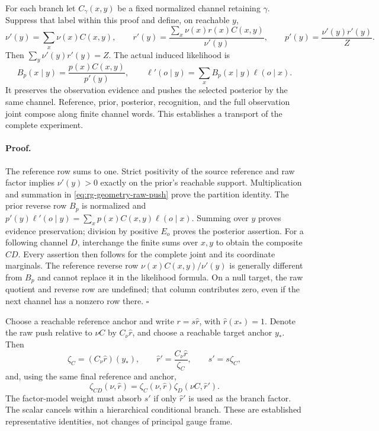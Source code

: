 For each branch let $C_\gamma(x,y)$ be a fixed normalized channel retaining
$\gamma$. Suppress that label within this proof and define, on reachable
$y$,
\begin{equation}
 \nu'(y)=\sum_x\nu(x)C(x,y),\qquad
 r'(y)=\frac{\sum_x\nu(x)r(x)C(x,y)}{\nu'(y)},\qquad
 p'(y)=\frac{\nu'(y)r'(y)}{Z}.
 \label{eq:rg-geometry-raw-push}
\end{equation}
Then $\sum_y\nu'(y)r'(y)=Z$. The actual induced likelihood is
\begin{equation}
 B_p(x\mid y)=\frac{p(x)C(x,y)}{p'(y)},\qquad
 \ell'(o\mid y)=\sum_xB_p(x\mid y)\ell(o\mid x).
 \label{eq:rg-geometry-likelihood}
\end{equation}
It preserves the observation evidence and pushes the selected posterior by
the same channel. Reference, prior, posterior, recognition, and the full
observation joint compose along finite channel words. This establishes a
transport of the complete experiment. 

\paragraph{Proof.}
The reference row sums to one. Strict positivity of the source reference
and raw factor implies $\nu'(y)>0$ exactly on the prior's reachable support.
Multiplication and summation in \cref{eq:rg-geometry-raw-push} prove the
partition identity. The prior reverse row $B_p$ is normalized and
$p'(y)\ell'(o\mid y)=\sum_xp(x)C(x,y)\ell(o\mid x)$.
Summing over $y$ proves evidence preservation; division by positive $E_o$
proves the posterior assertion. For a following channel $D$, interchange
the finite sums over $x,y$ to obtain the composite $CD$. Every assertion
then follows for the complete joint and its coordinate marginals. The
reference reverse row $\nu(x)C(x,y)/\nu'(y)$ is generally different from
$B_p$ and cannot replace it in the likelihood formula. On a null target,
the raw quotient and reverse row are undefined; that column contributes
zero, even if the next channel has a nonzero row there.
$\square$

Choose a reachable reference anchor and write $r=s\widehat r$, with
$\widehat r(x_*)=1$. Denote the raw push relative to $\nu C$ by
$C_\nu\widehat r$, and choose a reachable target anchor $y_*$.
Then
\begin{equation}
 \zeta_C=(C_\nu\widehat r)(y_*),\qquad
 \widehat r'=\frac{C_\nu\widehat r}{\zeta_C},\qquad
 s'=s\zeta_C,
 \label{eq:rg-geometry-anchor}
\end{equation}
and, using the same final reference and anchor,
\begin{equation}
 \zeta_{CD}(\nu,\widehat r)
 =\zeta_C(\nu,\widehat r)
   \zeta_D(\nu C,\widehat r').
 \label{eq:rg-geometry-scalar-cocycle}
\end{equation}
The factor-model weight must absorb $s'$ if only $\widehat r'$ is used as
the branch factor. The scalar cancels within a hierarchical conditional
branch. These are established representative identities, not changes of
principal gauge frame. 

